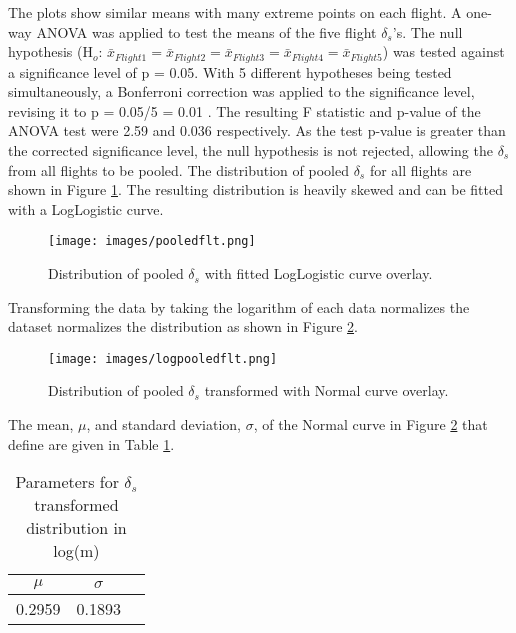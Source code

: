 The plots show similar means with many extreme points on each flight. A one-way ANOVA was applied to test the means of the five flight $\delta_{s}$'s. The null hypothesis (H$_{o}$: $\bar{x}_{Flight 1} = \bar{x}_{Flight 2}= \bar{x}_{Flight 3}= \bar{x}_{Flight 4}= \bar{x}_{Flight 5}$) was tested against a significance level of p = 0.05. With 5 different hypotheses being tested simultaneously, a Bonferroni correction was applied to the significance level, revising it to  p = 0.05/5 = 0.01 \citep{Rasch2011}.  The resulting F statistic and p-value of the ANOVA test were 2.59 and 0.036 respectively. As the test p-value is greater than the corrected significance level, the null hypothesis is not rejected, allowing the $\delta_{s}$ from all flights to be pooled.  The distribution of pooled  $\delta_{s}$ for all flights are shown in Figure \ref{fig:pooledflt}. The resulting distribution is heavily skewed and can be fitted with a LogLogistic curve. 

\begin{figure}[H]
\centering
\texttt{[image: images/pooledflt.png]} 
\caption{Distribution of pooled $\delta_{s}$ with fitted LogLogistic curve overlay.}
\label{fig:pooledflt}
\end{figure}

Transforming the data by taking the logarithm of each data normalizes the dataset normalizes the distribution as shown in Figure \ref{fig:logpooledflt}.

\begin{figure}[H]
\centering
\texttt{[image: images/logpooledflt.png]} 
\caption{Distribution of pooled $\delta_{s}$ transformed with Normal curve overlay.}
\label{fig:logpooledflt}
\end{figure}


The mean, $\mu$, and standard deviation, $\sigma$, of  the Normal curve in Figure  \ref{fig:logpooledflt} that define are given in Table \ref{tab:gapnormal}.

\begin{table}[H]
\centering
\caption{Parameters for $\delta_{s}$ transformed distribution in log(m)}
\label{tab:gapnormal}
\begin{tabular}{@{}ccc@{}}
\toprule
 \textbf{$\mu$} & \textbf{$\sigma$} \\ \midrule
 0.2959 & 0.1893 \\ \bottomrule
\end{tabular}
\end{table}

